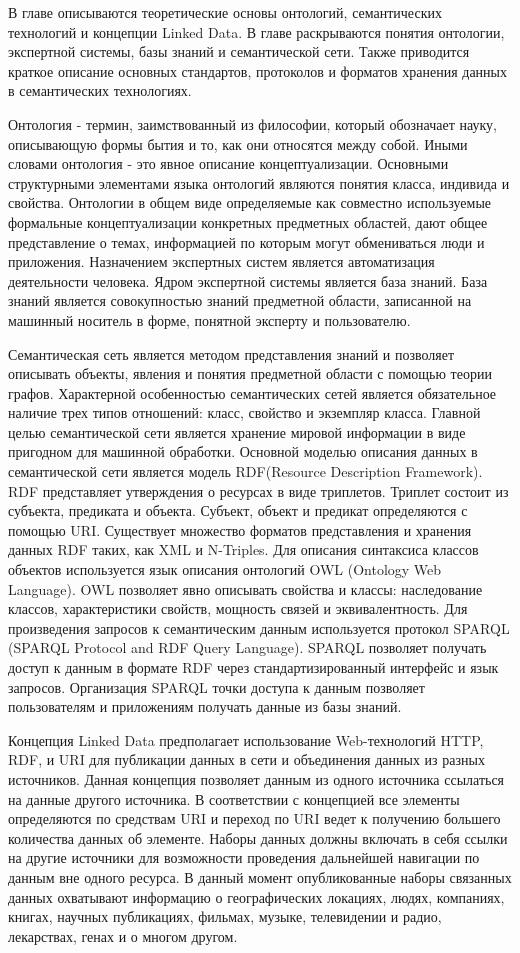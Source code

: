 В главе описываются теоретические основы онтологий, семантических технологий и концепции Linked Data. В главе раскрываются понятия онтологии, экспертной системы, базы знаний и семантической сети. Также приводится краткое описание основных стандартов, протоколов и форматов хранения данных в семантических технологиях.

Онтология - термин, заимствованный из философии, который обозначает науку, описывающую формы бытия и то, как они относятся между собой. Иными словами онтология - это явное описание концептуализации. Основными структурными элементами языка онтологий являются понятия класса, индивида и свойства. Онтологии в общем виде определяемые как совместно используемые формальные концептуализации конкретных предметных областей, дают общее представление о темах, информацией по которым могут обмениваться люди и приложения. Назначением экспертных систем является автоматизация деятельности человека. Ядром экспертной системы является база знаний. База знаний является совокупностью  знаний предметной области, записанной на машинный носитель в форме, понятной эксперту и пользователю.

Семантическая сеть является  методом представления знаний и позволяет описывать объекты, явления и понятия предметной области с помощью теории графов. Характерной особенностью семантических сетей является обязательное наличие трех типов отношений: класс, свойство и экземпляр класса. Главной целью семантической сети является хранение мировой информации в виде пригодном для машинной обработки. Основной моделью описания данных в семантической сети является модель RDF(Resource Description Framework).  RDF представляет утверждения о ресурсах в виде триплетов. Триплет состоит из субъекта, предиката и объекта. Субъект, объект и предикат определяются с помощью URI. Существует множество форматов представления и хранения данных RDF таких, как XML и N-Triples. Для описания синтаксиса классов объектов используется язык описания онтологий OWL (Ontology Web Language). OWL позволяет явно описывать свойства и классы: наследование классов, характеристики свойств, мощность связей и эквивалентность. Для произведения запросов к семантическим данным используется протокол SPARQL (SPARQL Protocol and RDF Query Language). SPARQL позволяет получать доступ к данным в формате RDF через стандартизированный интерфейс и язык запросов. Организация SPARQL точки доступа к данным позволяет пользователям и приложениям получать данные из базы знаний.

Концепция Linked Data предполагает использование Web-технологий HTTP, RDF, и URI для публикации данных в сети и объединения данных из разных источников. Данная концепция позволяет данным из одного источника ссылаться на данные другого источника. В соответствии с концепцией все элементы определяются по средствам URI и переход по URI ведет к получению большего количества данных об элементе. Наборы данных должны включать в себя ссылки на другие источники для возможности проведения дальнейшей навигации по данным вне одного ресурса. В данный момент опубликованные наборы связанных данных охватывают информацию о географических локациях, людях, компаниях, книгах, научных публикациях, фильмах, музыке, телевидении и радио, лекарствах, генах и о многом другом.

